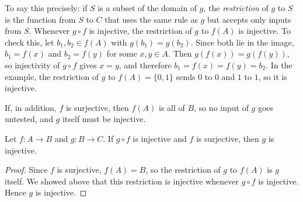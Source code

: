 To say this precisely: if $S$ is a subset of the domain of $g$, the \emph{restriction} of $g$ to $S$ is the function from $S$ to $C$ that uses the same rule as $g$ but accepts only inputs from $S$. Whenever $g\circ f$ is injective, the restriction of $g$ to $f(A)$ is injective. To check this, let $b_1,b_2\in f(A)$ with $g(b_1)=g(b_2)$. Since both lie in the image, $b_1=f(x)$ and $b_2=f(y)$ for some $x,y\in A$. Then $g(f(x))=g(f(y))$, so injectivity of $g\circ f$ gives $x=y$, and therefore $b_1=f(x)=f(y)=b_2$. In the example, the restriction of $g$ to $f(A)=\{0,1\}$ sends $0$ to $0$ and $1$ to $1$, so it is injective.

If, in addition, $f$ is surjective, then $f(A)$ is all of $B$, so no input of $g$ goes untested, and $g$ itself must be injective.

\par\noindent\begin{minipage}{\linewidth}
\begin{proposition}\label{ch03:prop:surjrescue}
Let $f:A\to B$ and $g:B\to C$. If $g\circ f$ is injective and $f$ is surjective, then $g$ is injective.
\end{proposition}
\end{minipage}\par

\begin{proof}
Since $f$ is surjective, $f(A)=B$, so the restriction of $g$ to $f(A)$ is $g$ itself. We showed above that this restriction is injective whenever $g\circ f$ is injective. Hence $g$ is injective.
\end{proof}
